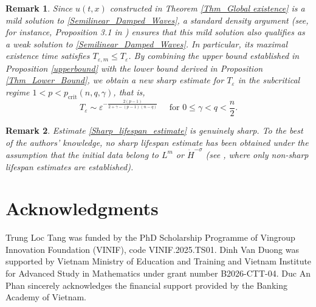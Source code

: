 \documentclass[11pt,reqno]{amsart}
\newtheorem{remark}{Remark}[section]
\begin{document}
\begin{remark}
\rm{
Since $u(t, x)$ constructed in Theorem \ref{Thm_Global existence} is a mild solution to \eqref{Semilinear_Damped_Waves}, a standard density argument (see, for instance, Proposition 3.1 in \cite{Ikeda2013}) ensures that this mild solution also qualifies as a weak solution to \eqref{Semilinear_Damped_Waves}. In particular, its maximal existence time satisfies $T_{\varepsilon,m}\leq T_{\varepsilon}$. By combining the upper bound established in Proposition \ref{upperbound} with the lower bound derived in Proposition \ref{Thm_Lower_Bound}, we obtain a new sharp estimate for $T_{\varepsilon}$ in the subcritical regime $1<p<p_{\mathrm{crit}}(n, q, \gamma)$, that is,
\begin{equation}\label{Sharp_lifespan_estimate}
T_{\varepsilon}\sim \varepsilon^{-\frac{2(p-1)}{2+\gamma-(p-1)(n-q)}} \quad \text{ for $0\leq \gamma<q<\frac{n}{2}$}.
\end{equation}
}
\end{remark}
\begin{remark} \label{remark_sharp}
{\rm
Estimate \eqref{Sharp_lifespan_estimate} is genuinely sharp. To the best of the authors' knowledge, no sharp lifespan estimate has been obtained under the assumption that the initial data belong to $L^m$ or $\dot{H}^{-\sigma}$ (see \cite{Ikeda2019,DuongDao2026}, where only non-sharp lifespan estimates are established).
}
\end{remark}


\section*{Acknowledgments}
Trung Loc Tang was funded by the PhD Scholarship Programme of Vingroup Innovation Foundation (VINIF), code VINIF.2025.TS01. Dinh Van Duong was supported by Vietnam Ministry of Education and Training and Vietnam Institute for Advanced Study in Mathematics under grant number B2026-CTT-04. Duc An Phan sincerely acknowledges the financial support provided by the Banking Academy of Vietnam.
\end{document}
